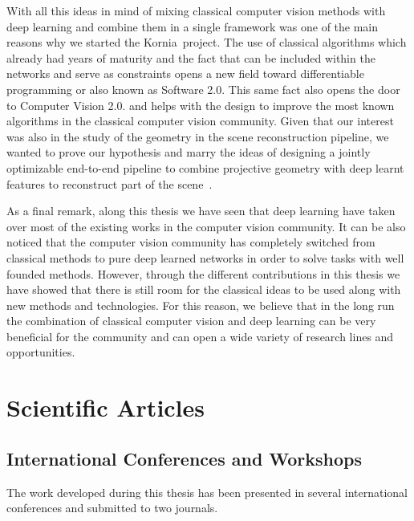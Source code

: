 With all this ideas in mind of mixing classical computer vision methods with deep learning and combine them in a single framework was one of the main reasons why we started the Kornia~\cite{eriba2019kornia}project. The use of classical algorithms which already had years of maturity and the fact that can be included within the networks and serve as constraints opens a new field toward differentiable programming or also known as Software 2.0. This same fact also opens the door to Computer Vision 2.0. and helps with the design to improve the most known algorithms in the classical computer vision community. Given that our interest was also in the study of the geometry in the scene reconstruction pipeline, we wanted to prove our hypothesis and marry the ideas of designing a jointly optimizable end-to-end pipeline to combine projective geometry with deep learnt features to reconstruct part of the scene~\cite{eriba2020cvpr}.

As a final remark, along this thesis we have seen that deep learning have taken over most of the existing works in the computer vision community. It can be also noticed that the computer vision community has completely switched from classical methods to pure deep learned networks in order to solve tasks with well founded methods. However, through the different contributions in this thesis we have showed that there is still room for the classical ideas to be used along with new methods and technologies. For this reason, we believe that in the long run the combination of classical computer vision and deep learning can be very beneficial for the community and can open a wide variety of research lines and opportunities.

\section{Scientific Articles}

\subsection{International Conferences and Workshops}

The work developed during this thesis has been presented in several international conferences and submitted to two journals.

